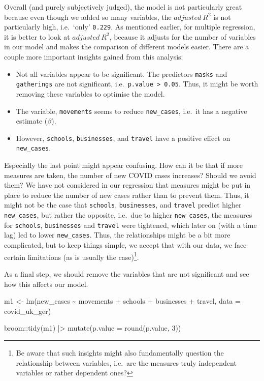 \documentclass[
  letterpaper,
]{krantz}
\makeatletter
\newenvironment{Shaded}{\begin{snugshade}}{\end{snugshade}}
\newcommand{\AttributeTok}[1]{\textcolor[rgb]{0.40,0.45,0.13}{#1}}
\newcommand{\DecValTok}[1]{\textcolor[rgb]{0.68,0.00,0.00}{#1}}
\newcommand{\FunctionTok}[1]{\textcolor[rgb]{0.28,0.35,0.67}{#1}}
\newcommand{\NormalTok}[1]{\textcolor[rgb]{0.00,0.23,0.31}{#1}}
\newcommand{\OtherTok}[1]{\textcolor[rgb]{0.00,0.23,0.31}{#1}}
\newcommand{\SpecialCharTok}[1]{\textcolor[rgb]{0.37,0.37,0.37}{#1}}
\newenvironment{kframe}{%
\medskip{}
\setlength{\fboxsep}{.8em}
 \def\at@end@of@kframe{}%
 \ifinner\ifhmode%
  \def\at@end@of@kframe{\end{minipage}}%
  \begin{minipage}{\columnwidth}%
 \fi\fi%
 \def\FrameCommand##1{\hskip\@totalleftmargin \hskip-\fboxsep
 \colorbox{shadecolor}{##1}\hskip-\fboxsep
     \hskip-\linewidth \hskip-\@totalleftmargin \hskip\columnwidth}%
 \MakeFramed {\advance\hsize-\width
   \@totalleftmargin\z@ \linewidth\hsize
   \@setminipage}}%
 {\par\unskip\endMakeFramed%
 \at@end@of@kframe}
\renewenvironment{Shaded}{\begin{kframe}}{\end{kframe}}
\makeatother
\begin{document}
Overall (and purely subjectively judged), the model is not particularly
great because even though we added so many variables, the
\(adjusted \ R^2\) is not particularly high, i.e.~`only' \texttt{0.229}.
As mentioned earlier, for multiple regression, it is better to look at
\(adjusted \ R^2\), because it adjusts for the number of variables in
our model and makes the comparison of different models easier. There are
a couple more important insights gained from this analysis:

\begin{itemize}
\item
  Not all variables appear to be significant. The predictors
  \texttt{masks} and \texttt{gatherings} are not significant,
  i.e.~\texttt{p.value\ \textgreater{}\ 0.05}. Thus, it might be worth
  removing these variables to optimise the model.
\item
  The variable, \texttt{movements} seems to reduce \texttt{new\_cases},
  i.e.~it has a negative estimate (\(\beta\)).
\item
  However, \texttt{schools}, \texttt{businesses}, and \texttt{travel}
  have a positive effect on \texttt{new\_cases}.
\end{itemize}

Especially the last point might appear confusing. How can it be that if
more measures are taken, the number of new COVID cases increases? Should
we avoid them? We have not considered in our regression that measures
might be put in place to reduce the number of new cases rather than to
prevent them. Thus, it might not be the case that \texttt{schools},
\texttt{businesses}, and \texttt{travel} predict higher
\texttt{new\_cases}, but rather the opposite, i.e.~due to higher
\texttt{new\_cases}, the measures for \texttt{schools},
\texttt{businesses} and \texttt{travel} were tightened, which later on
(with a time lag) led to lower \texttt{new\_cases}. Thus, the
relationships might be a bit more complicated, but to keep things
simple, we accept that with our data, we face certain limitations (as is
usually the case)\footnote{Be aware that such insights might also
  fundamentally question the relationship between variables, i.e.~are
  the measures truly independent variables or rather dependent ones?}.

As a final step, we should remove the variables that are not significant
and see how this affects our model.

\begin{Shaded}
\begin{Highlighting}[]
\NormalTok{m1 }\OtherTok{\textless{}{-}} \FunctionTok{lm}\NormalTok{(new\_cases }\SpecialCharTok{\textasciitilde{}}\NormalTok{ movements }\SpecialCharTok{+}\NormalTok{ schools }\SpecialCharTok{+}\NormalTok{ businesses }\SpecialCharTok{+}\NormalTok{ travel,}
         \AttributeTok{data =}\NormalTok{ covid\_uk\_ger)}

\NormalTok{broom}\SpecialCharTok{::}\FunctionTok{tidy}\NormalTok{(m1) }\SpecialCharTok{|\textgreater{}}
  \FunctionTok{mutate}\NormalTok{(}\AttributeTok{p.value =} \FunctionTok{round}\NormalTok{(p.value, }\DecValTok{3}\NormalTok{))}
\end{Highlighting}
\end{Shaded}
\end{document}

